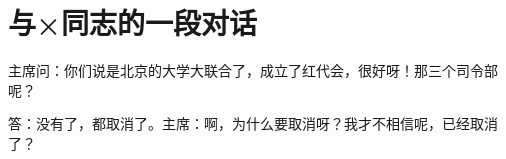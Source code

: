 \section[与×同志的一段对话（一九六七年四月）]{与×同志的一段对话}


主席问：你们说是北京的大学大联合了，成立了红代会，很好呀！那三个司令部呢？

答：没有了，都取消了。主席：啊，为什么要取消呀？我才不相信呢，已经取消了？


